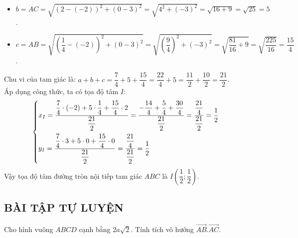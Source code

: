 \begin{vd}
{\begin{itemize}
            \item $b = AC = \sqrt{(2 - (-2))^2 + (0 - 3)^2} = \sqrt{4^2 + (-3)^2} = \sqrt{16 + 9} = \sqrt{25} = 5$.
            \item $c = AB = \sqrt{\left(\dfrac{1}{4} - (-2)\right)^2 + (0 - 3)^2} = \sqrt{\left(\dfrac{9}{4}\right)^2 + (-3)^2} = \sqrt{\dfrac{81}{16} + 9} = \sqrt{\dfrac{225}{16}} = \dfrac{15}{4}$.
        \end{itemize}
        Chu vi của tam giác là: $a + b + c = \dfrac{7}{4} + 5 + \dfrac{15}{4} = \dfrac{22}{4} + 5 = \dfrac{11}{2} + \dfrac{10}{2} = \dfrac{21}{2}$.\\
        Áp dụng công thức, ta có tọa độ tâm $I$:
        \[ \begin{cases} x_I = \dfrac{\dfrac{7}{4} \cdot (-2) + 5 \cdot \dfrac{1}{4} + \dfrac{15}{4} \cdot 2}{\dfrac{21}{2}} = \dfrac{-\dfrac{14}{4} + \dfrac{5}{4} + \dfrac{30}{4}}{\dfrac{21}{2}} = \dfrac{\dfrac{21}{4}}{\dfrac{21}{2}} = \dfrac{1}{2} \vspace{5pt} \\ y_I = \dfrac{\dfrac{7}{4} \cdot 3 + 5 \cdot 0 + \dfrac{15}{4} \cdot 0}{\dfrac{21}{2}} = \dfrac{\dfrac{21}{4}}{\dfrac{21}{2}} = \dfrac{1}{2} \end{cases} \]
        Vậy tọa độ tâm đường tròn nội tiếp tam giác $ABC$ là $I\left(\dfrac{1}{2}; \dfrac{1}{2}\right)$.
    }
\end{vd}

\subsection{BÀI TẬP TỰ LUYỆN}
\baitaptl
\begin{bt}
    Cho hình vuông $ABCD$ cạnh bằng $2a\sqrt{2}$. Tính tích vô hướng $\overrightarrow{AB}.\overrightarrow{AC}.$
\end{bt}

